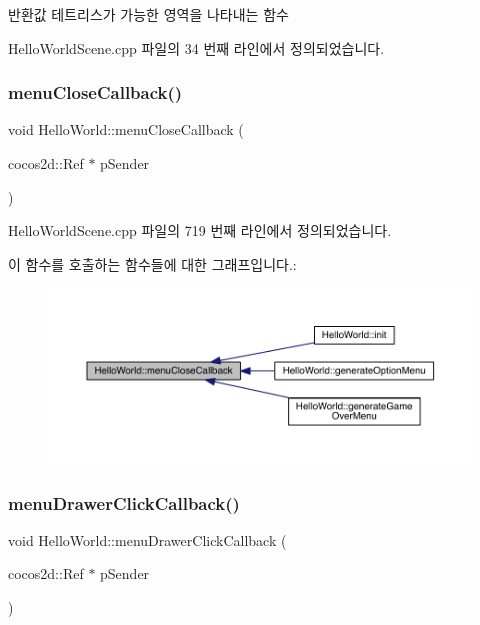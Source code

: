 \begin{DoxyReturn}{반환값}
테트리스가 가능한 영역을 나타내는 함수 
\end{DoxyReturn}


Hello\+World\+Scene.\+cpp 파일의 34 번째 라인에서 정의되었습니다.

\mbox{\label{class_hello_world_ac4ab2f5e922e659d4f137591c0f6a9b0}} 
\subsubsection{\texorpdfstring{menu\+Close\+Callback()}{menuCloseCallback()}}
{\footnotesize\ttfamily void Hello\+World\+::menu\+Close\+Callback (\begin{DoxyParamCaption}\item[{cocos2d\+::\+Ref $\ast$}]{p\+Sender }\end{DoxyParamCaption})}



Hello\+World\+Scene.\+cpp 파일의 719 번째 라인에서 정의되었습니다.

이 함수를 호출하는 함수들에 대한 그래프입니다.\+:
\nopagebreak
\begin{figure}[H]
\begin{center}
\leavevmode
\includegraphics[width=350pt]{class_hello_world_ac4ab2f5e922e659d4f137591c0f6a9b0_icgraph}
\end{center}
\end{figure}
\mbox{\label{class_hello_world_a1609fd202ff4b899571aeb34b3cdaed4}} 
\subsubsection{\texorpdfstring{menu\+Drawer\+Click\+Callback()}{menuDrawerClickCallback()}}
{\footnotesize\ttfamily void Hello\+World\+::menu\+Drawer\+Click\+Callback (\begin{DoxyParamCaption}\item[{cocos2d\+::\+Ref $\ast$}]{p\+Sender }\end{DoxyParamCaption})}




